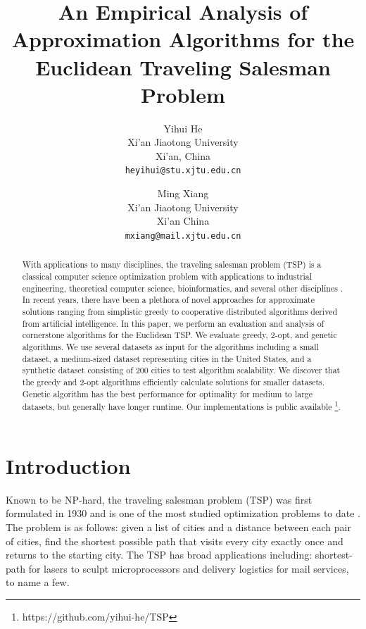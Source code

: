 \documentclass[10pt,twocolumn,letterpaper]{article}
\begin{document}
\title{An Empirical Analysis of Approximation Algorithms for the Euclidean Traveling Salesman Problem
}

\author{Yihui He\\
Xi'an Jiaotong University\\
Xi'an, China\\
{\tt\small heyihui@stu.xjtu.edu.cn}
\and
Ming Xiang\\
Xi'an Jiaotong University\\
Xi'an China\\
{\tt\small mxiang@mail.xjtu.edu.cn}
}

\maketitle

\begin{abstract}
With applications to many disciplines, the traveling salesman problem (TSP) is a classical computer science optimization problem with applications to industrial engineering, theoretical computer science, bioinformatics, and several other disciplines \cite{introduction}. In recent years, 
there have been a plethora of novel approaches for approximate solutions ranging from simplistic greedy to cooperative distributed algorithms derived from artificial intelligence. 
In this paper,
we perform an evaluation and analysis of cornerstone algorithms for the Euclidean TSP. We evaluate greedy, 2-opt, and genetic algorithms. We use several datasets as input for the algorithms including a small dataset, a medium-sized dataset representing
cities in the United States, and a synthetic dataset consisting of 200 cities to test algorithm scalability. We discover that
the greedy and 2-opt algorithms efficiently calculate solutions for smaller datasets. Genetic algorithm has the best
performance for optimality for medium
to large datasets, but generally have longer runtime. 
Our implementations is public available \footnote{https://github.com/yihui-he/TSP}.
\end{abstract}

\section{Introduction}
Known to be NP-hard, the traveling salesman problem (TSP) was first formulated in 1930 and is one of the most studied optimization problems to date \cite{hoffman1986traveling}. The problem is as follows: given a list of cities and a distance between each pair of cities, find the shortest possible path that visits every city exactly once and returns to the starting city. The TSP has broad applications including: shortest-path
for lasers to sculpt microprocessors and delivery logistics for mail services, to name a few.
\end{document}
